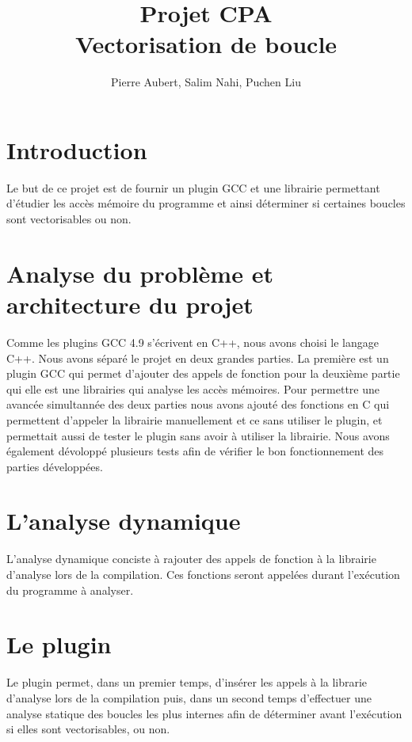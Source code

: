 \documentclass[12pt,french]{article}
\title{\color{blue}Projet CPA \\ Vectorisation de boucle}
\author{Pierre Aubert, Salim Nahi, Puchen Liu}
\begin{document}
\maketitle

\section*{\color{blue}Introduction}

Le but de ce projet est de fournir un plugin GCC et une librairie permettant d'étudier les accès mémoire du programme et ainsi déterminer si certaines boucles sont vectorisables ou non.

\section{\color{blue}Analyse du problème et architecture du projet}

Comme les plugins GCC 4.9 s'écrivent en C++, nous avons choisi le langage C++. Nous avons séparé le projet en deux grandes parties. La première est un plugin GCC qui permet d'ajouter des appels de fonction pour la deuxième partie qui elle est une librairies qui analyse les accès mémoires. Pour permettre une avancée simultannée des deux parties nous avons ajouté des fonctions en C qui permettent d'appeler la librairie manuellement et ce sans utiliser le plugin, et permettait aussi de tester le plugin sans avoir à utiliser la librairie. Nous avons également dévoloppé plusieurs tests afin de vérifier le bon fonctionnement des parties développées.

\section{\color{blue}L'analyse dynamique}

L'analyse dynamique conciste à rajouter des appels de fonction à la librairie d'analyse lors de la compilation. Ces fonctions seront appelées durant l'exécution du programme à analyser. 


\section{\color{blue}Le plugin}

Le plugin permet, dans un premier temps, d'insérer les appels à la librarie d'analyse lors de la compilation puis, dans un second temps d'effectuer une analyse statique des boucles les plus internes afin de déterminer avant l'exécution si elles sont vectorisables, ou non.
\end{document}
